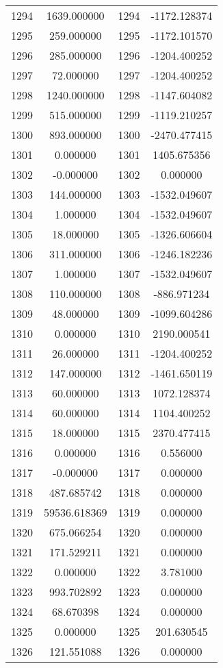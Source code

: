 \documentclass[12pt]{article}
\begin{document}
\begin{longtable}{@{}cccc@{}}
1294 & 1639.000000 & 1294 & -1172.128374 \\
1295 & 259.000000 & 1295 & -1172.101570 \\
1296 & 285.000000 & 1296 & -1204.400252 \\
1297 & 72.000000 & 1297 & -1204.400252 \\
1298 & 1240.000000 & 1298 & -1147.604082 \\
1299 & 515.000000 & 1299 & -1119.210257 \\
1300 & 893.000000 & 1300 & -2470.477415 \\
1301 & 0.000000 & 1301 & 1405.675356 \\
1302 & -0.000000 & 1302 & 0.000000 \\
1303 & 144.000000 & 1303 & -1532.049607 \\
1304 & 1.000000 & 1304 & -1532.049607 \\
1305 & 18.000000 & 1305 & -1326.606604 \\
1306 & 311.000000 & 1306 & -1246.182236 \\
1307 & 1.000000 & 1307 & -1532.049607 \\
1308 & 110.000000 & 1308 & -886.971234 \\
1309 & 48.000000 & 1309 & -1099.604286 \\
1310 & 0.000000 & 1310 & 2190.000541 \\
1311 & 26.000000 & 1311 & -1204.400252 \\
1312 & 147.000000 & 1312 & -1461.650119 \\
1313 & 60.000000 & 1313 & 1072.128374 \\
1314 & 60.000000 & 1314 & 1104.400252 \\
1315 & 18.000000 & 1315 & 2370.477415 \\
1316 & 0.000000 & 1316 & 0.556000 \\
1317 & -0.000000 & 1317 & 0.000000 \\
1318 & 487.685742 & 1318 & 0.000000 \\
1319 & 59536.618369 & 1319 & 0.000000 \\
1320 & 675.066254 & 1320 & 0.000000 \\
1321 & 171.529211 & 1321 & 0.000000 \\
1322 & 0.000000 & 1322 & 3.781000 \\
1323 & 993.702892 & 1323 & 0.000000 \\
1324 & 68.670398 & 1324 & 0.000000 \\
1325 & 0.000000 & 1325 & 201.630545 \\
1326 & 121.551088 & 1326 & 0.000000 \\

\end{longtable}
\end{document}
